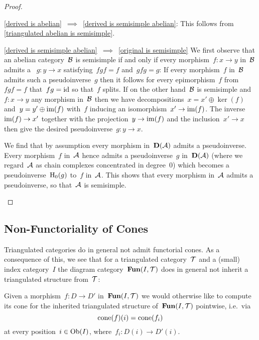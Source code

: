 \documentclass[a4paper,10pt]{scrartcl}
\begin{document}
\begin{proof}
\begin{implicationslist}
    \item[\ref{derived is abelian}~$\implies$~\ref{derived is semisimple abelian}:]
      This follows from \cref{triangulated abelian is semisimple}.
    
    \item[\ref{derived is semisimple abelian}~$\implies$~\ref{original is semisimple}]
      We first observe that an abelian category~$\mathcal{B}$ is semisimple if and only if every morphism~$f \colon x \to y$ in~$\mathcal{B}$ admits a ~$g \colon y \to x$ satisfying~$fgf = f$ and~$gfg = g$:
      If every morphism~$f$ in~$\mathcal{B}$ admits such a pseudoinverse~$g$ then it follows for every epimorphism~$f$ from~$fgf = f$ that~$fg = \mathrm{id}$ so that~$f$ splits. 
      If on the other hand~$\mathcal{B}$ is semisimple and~$f \colon x \to y$ any morphism in~$\mathcal{B}$ then we have decompositions~$x = x' \oplus \ker(f)$ and~$y = y' \oplus \operatorname{im}(f)$ with~$f$ inducing an isomorphism~$x' \to \operatorname{im}(f)$.
      The inverse~$\operatorname{im}(f) \to x'$ together with the projection~$y \to \operatorname{im}(f)$ and the inclusion~$x' \to x$ then give the desired pseudoinverse~$g \colon y \to x$.
      
      We find that by assumption every morphism in~$\mathbf{D}(\mathcal{A})$ admits a pseudoinverse.
      Every morphism~$f$ in~$\mathcal{A}$ hence admits a pseudoinverse~$g$ in~$\mathbf{D}(\mathcal{A})$ (where we regard~$\mathcal{A}$ as chain complexes concentrated in degree~$0$) which becomes a pseudoinverse~$\operatorname{H}_0(g)$ to~$f$ in~$\mathcal{A}$.
      This shows that every morphism in~$\mathcal{A}$ admits a pseudoinverse, so that~$\mathcal{A}$ is semisimple.
    \qedhere
  \end{implicationslist}
\end{proof}



\subsection{Non-Functoriality of Cones}

Triangulated categories do in general not admit functorial cones.
As a consequence of this, we see that for a triangulated category~$\mathcal{T}$ and a (small) index category~$I$ the diagram category~$\mathbf{Fun}(I, \mathcal{T})$ does in general not inherit a triangulated structure from~$\mathcal{T}$:

Given a morphism~$f \colon D \to D'$ in~$\mathbf{Fun}(I, \mathcal{T})$ we would otherwise like to compute its cone for the inherited triangulated structure of~$\mathbf{Fun}(I, \mathcal{T})$ pointwise, i.e.\ via
\[
  \operatorname{cone}(f)(i)
  =
  \operatorname{cone}(f_i)
\]
at every position~$i \in \operatorname{Ob}(I)$, where~$f_i \colon D(i) \to D'(i)$.
\end{document}
